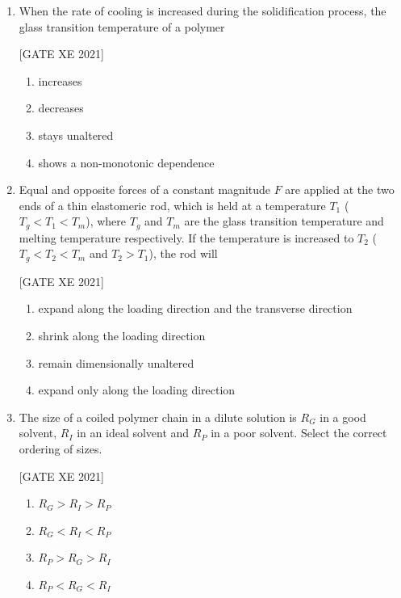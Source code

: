 \documentclass[journal,12pt,onecolumn]{IEEEtran}
\theoremstyle{remark}
\begin{document}
\begin{enumerate}[resume]
\item When the rate of cooling is increased during the solidification process, the glass transition temperature of a polymer

\hfill[GATE XE 2021]

\begin{multicols}{2}
\begin{enumerate}
\item increases
\item decreases
\item stays unaltered
\item shows a non-monotonic dependence
\end{enumerate}
\end{multicols}


\item Equal and opposite forces of a constant magnitude $F$ are applied at the two ends of a thin elastomeric rod, which is held at a temperature $T_1$ ($T_g < T_1 < T_m$), where $T_g$ and $T_m$ are the glass transition temperature and melting temperature respectively. If the temperature is increased to $T_2$ ($T_g < T_2 < T_m$ and $T_2 > T_1$), the rod will

\hfill[GATE XE 2021]

\begin{multicols}{2}
\begin{enumerate}
\item expand along the loading direction and the transverse direction
\item shrink along the loading direction
\item remain dimensionally unaltered
\item expand only along the loading direction
\end{enumerate}
\end{multicols}
\item The size of a coiled polymer chain in a dilute solution is $R_G$ in a good solvent, $R_I$ in an ideal solvent and $R_P$ in a poor solvent. Select the correct ordering of sizes.

\hfill[GATE XE 2021]

\begin{multicols}{2} %
\begin{enumerate}[label=(\Alph*)] %
    \item $R_G > R_I > R_P$
    \item $R_G < R_I < R_P$
    \item $R_P > R_G > R_I$
    \item $R_P < R_G < R_I$
\end{enumerate}
\end{multicols}


\end{enumerate}
\end{document}
